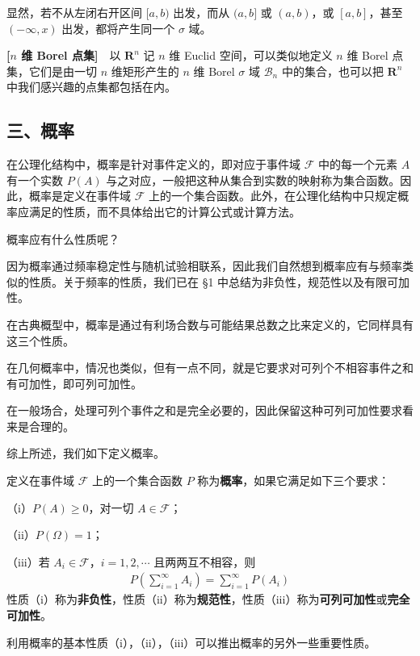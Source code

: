 \documentclass[../../main.tex]{subfiles}
\begin{document}
显然，若不从左闭右开区间 $[a,b)$ 出发，而从 $(a,b]$ 或 $(a,b)$，或 $[a,b]$，甚至 $(-\infty,x)$ 出发，都将产生同一个 $\sigma$ 域。

\textbf{[$n$ 维 Borel 点集]}~~以 $\mathbf{R}^n$ 记 $n$ 维 Euclid 空间，可以类似地定义 $n$ 维 Borel 点集，它们是由一切 $n$ 维矩形产生的 $n$ 维 Borel $\sigma$ 域 $\mathscr{B}_n$ 中的集合，也可以把 $\mathbf{R}^n$ 中我们感兴趣的点集都包括在内。

\subsection*{三、概率}

在公理化结构中，概率是针对事件定义的，即对应于事件域 $\mathscr{F}$ 中的每一个元素 $A$ 有一个实数 $P(A)$ 与之对应，一般把这种从集合到实数的映射称为集合函数。因此，概率是定义在事件域 $\mathscr{F}$ 上的一个集合函数。此外，在公理化结构中只规定概率应满足的性质，而不具体给出它的计算公式或计算方法。

概率应有什么性质呢？

因为概率通过频率稳定性与随机试验相联系，因此我们自然想到概率应有与频率类似的性质。关于频率的性质，我们已在 \S 1 中总结为非负性，规范性以及有限可加性。

在古典概型中，概率是通过有利场合数与可能结果总数之比来定义的，它同样具有这三个性质。

在几何概率中，情况也类似，但有一点不同，就是它要求对可列个不相容事件之和有可加性，即可列可加性。

在一般场合，处理可列个事件之和是完全必要的，因此保留这种可列可加性要求看来是合理的。

综上所述，我们如下定义概率。

\begin{definition}[概率]\label{definition:ch01-概率}
定义在事件域 $\mathscr{F}$ 上的一个集合函数 $P$ 称为\textbf{概率}，如果它满足如下三个要求：

（i）$P(A)\geqslant 0$，对一切 $A\in\mathscr{F}$；

（ii）$P(\Omega)=1$；

（iii）若 $A_i\in\mathscr{F}$，$i=1,2,\cdots$ 且两两互不相容，则
\begin{align}
P\left(\sum_{i=1}^{\infty}A_i\right)=\sum_{i=1}^{\infty}P(A_i)\label{align:ch01-概率可列可加}
\end{align}
性质（i）称为\textbf{非负性}，性质（ii）称为\textbf{规范性}，性质（iii）称为\textbf{可列可加性}或\textbf{完全可加性}。
\end{definition}

利用概率的基本性质（i），（ii），（iii）可以推出概率的另外一些重要性质。
\end{document}
